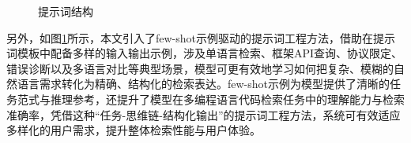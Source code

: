 \documentclass[UTF8,a4paper,12pt]{ctexart}
\numberwithin{equation}{section}
\begin{document}
\begin{figure}[H]
	\caption{提示词结构}
	\label{prompt2}
\end{figure}
另外，如图\ref{prompt2}所示，本文引入了few-shot示例驱动的提示词工程方法，借助在提示词模板中配备多样的输入输出示例，涉及单语言检索、框架API查询、协议限定、错误诊断以及多语言对比等典型场景，模型可更有效地学习如何把复杂、模糊的自然语言需求转化为精确、结构化的检索表达。few-shot示例为模型提供了清晰的任务范式与推理参考，还提升了模型在多编程语言代码检索任务中的理解能力与检索准确率，凭借这种“任务-思维链-结构化输出”的提示词工程方法，系统可有效适应多样化的用户需求，提升整体检索性能与用户体验。\par
\end{document}
